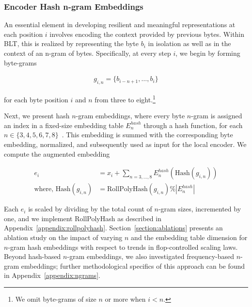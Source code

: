 \subsubsection{Encoder Hash n-gram Embeddings}
\label{sec:ngram-emb}
\label{sec:hash-emb}
An essential element in developing resilient and meaningful representations at each position $i$ involves encoding the context provided by previous bytes. Within {\textsc BLT}, this is realized by representing the byte $b_i$ in isolation as well as in the context of an n-gram of bytes. Specifically, at every step $i$, we begin by forming byte-grams

\begin{align}
    g_{i,n}=\{b_{i-n + 1},\ldots, b_i\}
\end{align}

for each byte position $i$ and $n$ from three to eight.\footnote{
We omit byte-grams of size $n$ or more when $i<n$. }

Next, we present hash $n$-gram embeddings, where every byte $n$-gram is assigned an index in a fixed-size embedding table $E_{n}^{hash}$ through a hash function, for each $n \in \{3,4,5,6,7,8\}$~\citep{bai2010learning}. This embedding is summed with the corresponding byte embedding, normalized, and subsequently used as input for the local encoder. We compute the augmented embedding

\begin{align}
e_i &= x_i + \sum_{n = 3,...,8}E_{n}^{hash}(\text{Hash}(g_{i,n})) \\
\text{where, Hash}(g_{i,n}) &= \text{RollPolyHash}(g_{i,n}) \% |E_{n}^{hash}|
\end{align}

Each $e_i$ is scaled by dividing by the total count of $n$-gram sizes, incremented by one, and we implement RollPolyHash as described in Appendix~\ref{appendix:rollpolyhash}. Section~\ref{section:ablations} presents an ablation study on the impact of varying $n$ and the embedding table dimension for $n$-gram hash embeddings with respect to trends in flop-controlled scaling laws. Beyond hash-based $n$-gram embeddings, we also investigated frequency-based $n$-gram embeddings; further methodological specifics of this approach can be found in Appendix~\ref{appendix:ngrams}.

